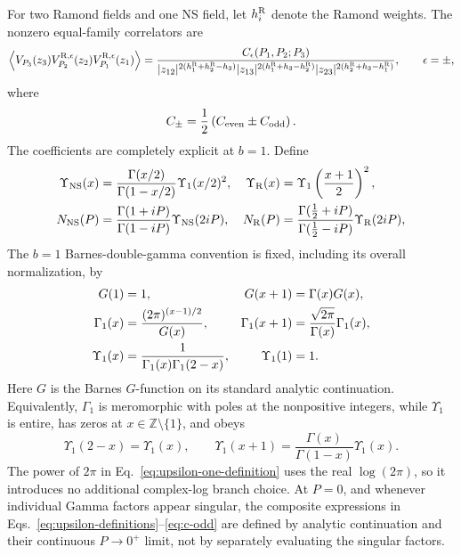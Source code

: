 \documentclass[11pt]{article}
\begin{document}
For two Ramond fields and one NS field, let $h_i^{\rm R}$ denote the
Ramond weights.  The nonzero equal-family correlators are
\begin{equation}
 \left\langle
 V_{P_3}(z_3)V_{P_2}^{\mathrm R,\epsilon}(z_2)
 V_{P_1}^{\mathrm R,\epsilon}(z_1)
 \right\rangle
 =\frac{C_\epsilon(P_1,P_2;P_3)}
 {|z_{12}|^{2(h_1^{\rm R}+h_2^{\rm R}-h_3)}
  |z_{13}|^{2(h_1^{\rm R}+h_3-h_2^{\rm R})}
  |z_{23}|^{2(h_2^{\rm R}+h_3-h_1^{\rm R})}},
 \qquad \epsilon=\pm,
 \label{eq:rrns-three-point}
\end{equation}
where
\begin{equation}
 C_\pm=\frac12\left(C_{\rm even}\pm C_{\rm odd}\right).
 \label{eq:cpm-definition-early}
\end{equation}
The coefficients are completely explicit at $b=1$.  Define
\begin{align}
 \Upsilon_{\rm NS}(x)
 &=\frac{\Gamma(x/2)}{\Gamma(1-x/2)}
   \Upsilon_1(x/2)^2,
 &
 \Upsilon_{\rm R}(x)
 &=\Upsilon_1\left(\frac{x+1}{2}\right)^2,\notag\\
 N_{\rm NS}(P)
 &=\frac{\Gamma(1+iP)}{\Gamma(1-iP)}
   \Upsilon_{\rm NS}(2iP),
 &
 N_{\rm R}(P)
 &=\frac{\Gamma(\frac12+iP)}{\Gamma(\frac12-iP)}
   \Upsilon_{\rm R}(2iP),
 \label{eq:upsilon-definitions}
\end{align}
The $b=1$ Barnes-double-gamma convention is fixed, including its overall
normalization, by \cite{BalthazarRodriguezYin2019LongString}
\begin{align}
 G(1)&=1,
 &G(x+1)&=\Gamma(x)G(x),\notag\\
 \Gamma_1(x)&=\frac{(2\pi)^{(x-1)/2}}{G(x)},
 &\Gamma_1(x+1)&=\frac{\sqrt{2\pi}}{\Gamma(x)}\Gamma_1(x),\notag\\
 \Upsilon_1(x)&=\frac{1}{\Gamma_1(x)\Gamma_1(2-x)},
 &\Upsilon_1(1)&=1.
 \label{eq:upsilon-one-definition}
\end{align}
Here $G$ is the Barnes $G$-function on its standard analytic continuation.
Equivalently, $\Gamma_1$ is meromorphic with poles at the nonpositive
integers, while $\Upsilon_1$ is entire, has zeros at
$x\in\mathbb Z\setminus\{1\}$, and obeys
\begin{equation}
 \Upsilon_1(2-x)=\Upsilon_1(x),
 \qquad
 \Upsilon_1(x+1)=\frac{\Gamma(x)}{\Gamma(1-x)}\Upsilon_1(x).
 \label{eq:upsilon-one-identities}
\end{equation}
The power of $2\pi$ in Eq.~\eqref{eq:upsilon-one-definition} uses the real
$\log(2\pi)$, so it introduces no additional complex-log branch choice.
At $P=0$, and whenever individual Gamma factors appear singular, the
composite expressions in Eqs.~\eqref{eq:upsilon-definitions}--\eqref{eq:c-odd}
are defined by analytic continuation and their continuous $P\to0^+$ limit,
not by separately evaluating the singular factors.
\end{document}
